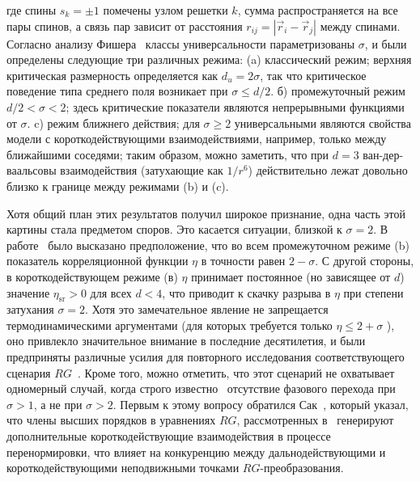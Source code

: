 где спины $s_{k}=\pm 1$ помечены узлом решетки $k$, сумма распространяется на все пары спинов, а связь пар зависит от расстояния $r_{i j}=\left|\vec {r}_{i}-\vec{r}_{j}\right|$ между спинами. Согласно анализу Фишера~\cite{10.1103/PhysRevLett.29.917} классы универсальности параметризованы $\sigma$, и были определены следующие три различных режима: (a) классический режим; верхняя критическая размерность определяется как $d_{u}=2\sigma$, так что критическое поведение типа среднего поля возникает при $\sigma \leq d / 2$. б) промежуточный режим $d/2<\sigma<2$; здесь критические показатели являются непрерывными функциями от $\sigma$. c) режим ближнего действия; для $\sigma\geq 2$ универсальными являются свойства модели с короткодействующими взаимодействиями, например, только между ближайшими соседями; таким образом, можно заметить, что при $d=3$ ван-дер-ваальсовы взаимодействия (затухающие как $1/r^{6}$) действительно лежат довольно близко к границе между режимами (b) и (c).

Хотя общий план этих результатов получил широкое признание, одна часть этой картины стала предметом споров. Это касается ситуации, близкой к $\sigma=2$. В работе~\cite{10.1103/PhysRevLett.29.917} было высказано предположение, что во всем промежуточном режиме (b) показатель корреляционной функции $\eta$ в точности равен $2-\sigma$. С другой стороны, в короткодействующем режиме (в) $\eta$ принимает постоянное (но зависящее от $d$) значение $\eta_{\mathrm{sr}}>0$ для всех $d<4 $, что приводит к скачку разрыва в $\eta$ при степени затухания $\sigma=2$. Хотя это замечательное явление не запрещается термодинамическими аргументами (для которых требуется только $\eta\leq 2+\sigma$ ), оно привлекло значительное внимание в последние десятилетия, и были предприняты различные усилия для повторного исследования соответствующего сценария $R G$~\cite{10.1103/PhysRevB.8.281, 10.1088/0305-4470/22/6/024}. Кроме того, можно отметить, что этот сценарий не охватывает одномерный случай, когда строго известно~\cite{10.1007/BF01654281} отсутствие фазового перехода при $\sigma>1$, а не при $\sigma>2$. Первым к этому вопросу обратился Сак~\cite{10.1103/PhysRevB.8.281}, который указал, что члены высших порядков в уравнениях $R G$, рассмотренных в~\cite{10.1103/PhysRevLett.29.917} генерируют дополнительные короткодействующие взаимодействия в процессе перенормировки, что влияет на конкуренцию между дальнодействующими и короткодействующими неподвижными точками $RG$-преобразования.

